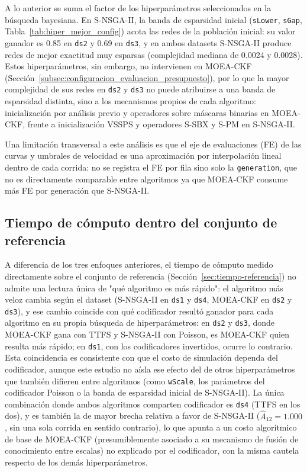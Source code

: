 A lo anterior se suma el factor de los hiperparámetros seleccionados en la búsqueda bayesiana. En S-NSGA-II, la banda de esparsidad inicial (\texttt{sLower}, \texttt{sGap}, Tabla~\ref{tab:hiper_mejor_config}) acota las redes de la población inicial: su valor ganador es 0.85 en \texttt{ds2} y 0.69 en \texttt{ds3}, y en ambos datasets S-NSGA-II produce redes de mejor exactitud muy esparsas (complejidad mediana de 0.0024 y 0.0028). Estos hiperparámetros, sin embargo, no intervienen en MOEA-CKF (Sección~\ref{subsec:configuracion_evaluacion_presupuesto}), por lo que la mayor complejidad de sus redes en \texttt{ds2} y \texttt{ds3} no puede atribuirse a una banda de esparsidad distinta, sino a los mecanismos propios de cada algoritmo: inicialización por análisis previo y operadores sobre máscaras binarias en MOEA-CKF, frente a inicialización VSSPS y operadores S-SBX y S-PM en S-NSGA-II.

Una limitación transversal a este análisis es que el eje de evaluaciones (FE) de las curvas y umbrales de velocidad es una aproximación por interpolación lineal dentro de cada corrida: no se registra el FE por fila sino solo la \texttt{generation}, que no es directamente comparable entre algoritmos ya que MOEA-CKF consume más FE por generación que S-NSGA-II.

\subsection{Tiempo de cómputo dentro del conjunto de referencia}
\label{sec:discusion-tiempo-referencia}

A diferencia de los tres enfoques anteriores, el tiempo de cómputo medido directamente sobre el conjunto de referencia (Sección~\ref{sec:tiempo-referencia}) no admite una lectura única de "qué algoritmo es más rápido": el algoritmo más veloz cambia según el dataset (S-NSGA-II en \texttt{ds1} y \texttt{ds4}, MOEA-CKF en \texttt{ds2} y \texttt{ds3}), y ese cambio coincide con qué codificador resultó ganador para cada algoritmo en su propia búsqueda de hiperparámetros: en \texttt{ds2} y \texttt{ds3}, donde MOEA-CKF gana con TTFS y S-NSGA-II con Poisson, es MOEA-CKF quien resulta más rápido; en \texttt{ds1}, con los codificadores invertidos, ocurre lo contrario. Esta coincidencia es consistente con que el costo de simulación dependa del codificador, aunque este estudio no aísla ese efecto del de otros hiperparámetros que también difieren entre algoritmos (como \texttt{wScale}, los parámetros del codificador Poisson o la banda de esparsidad inicial de S-NSGA-II). La única combinación donde ambos algoritmos comparten codificador es \texttt{ds4} (TTFS en los dos), y es también la de mayor brecha relativa a favor de S-NSGA-II ($\hat{A}_{12}=1.000$, sin una sola corrida en sentido contrario), lo que apunta a un costo algorítmico de base de MOEA-CKF (presumiblemente asociado a su mecanismo de fusión de conocimiento entre escalas) no explicado por el codificador, con la misma cautela respecto de los demás hiperparámetros.

